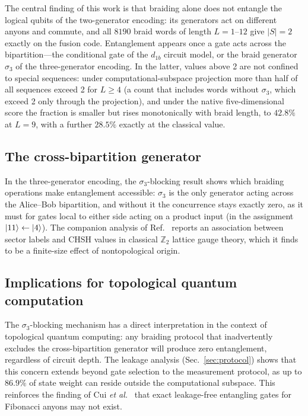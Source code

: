 \documentclass[aps,pra,twocolumn,superscriptaddress,longbibliography,floatfix,nofootinbib]{revtex4-2}
\begin{document}
The central finding of this work is that braiding alone does not
entangle the logical qubits of the two-generator encoding: its
generators act on different anyons and commute, and all $8190$ braid
words of length $L=1$--$12$ give $|S|=2$ exactly on the fusion code.
Entanglement appears once a gate acts across the bipartition---the
conditional gate of the $d_{1b}$ circuit model, or the braid generator
$\sigma_3$ of the three-generator encoding. In the latter, values above
2 are not confined to special sequences: under computational-subspace
projection more than half of all sequences exceed 2 for $L\geq 4$ (a
count that includes words without $\sigma_3$, which exceed 2 only
through the projection), and under the native five-dimensional score the
fraction is smaller but rises monotonically with braid length, to
$42.8\%$ at $L=9$, with a further $28.5\%$ exactly at the classical
value.

\subsection{The cross-bipartition generator}

In the three-generator encoding, the $\sigma_3$-blocking result shows
which braiding operations make entanglement accessible: $\sigma_3$ is
the only generator acting across the Alice--Bob bipartition, and without
it the concurrence stays exactly zero, as it must for gates local to
either side acting on a product input (in the assignment
$\ket{11}\leftarrow\ket{4}$). The companion analysis of
Ref.~\cite{Sayim2026topological} reports an association between sector
labels and CHSH values in classical $\mathbb{Z}_2$ lattice gauge theory,
which it finds to be a finite-size effect of nontopological origin.

\subsection{Implications for topological quantum computation}

The $\sigma_3$-blocking mechanism has a direct interpretation in
the context of topological quantum computing:
any braiding protocol that inadvertently excludes the
cross-bipartition generator will produce zero entanglement,
regardless of circuit depth.
The leakage analysis (Sec.~\ref{sec:protocol}) shows that this
concern extends beyond gate selection to the measurement
protocol, as up to $86.9\%$ of state weight can reside outside
the computational subspace.
This reinforces the finding of Cui \emph{et al.}~\cite{Cui2019}
that exact leakage-free entangling gates for Fibonacci anyons
may not exist.
\end{document}
